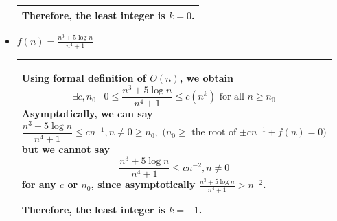 \documentclass[10pt]{article}
\newenvironment{answer}
    {\begin{center}
    \begin{tabular}{|p{1\textwidth}|}
    \hline
    }
    { 
    \\\hline
    \end{tabular} 
    \end{center}
    }
\begin{document}
\begin{itemize}
\begin{answer}
    Therefore, the least integer is $k = 0$.
  \end{answer} 

\item $f(n) = \frac{n^3 + 5 \log n}{n^4 + 1}$
  \begin{answer}
    Using formal definition of $O(n)$, we obtain
    \[\exists c,n_0 \mid 0 \le \frac{n^3 + 5 \log n}{n^4 + 1} \le c(n^k) \textrm{ for all $n \ge n_0$}\]
    Asymptotically, we can say
    \[ \frac{n^3 + 5 \log n}{n^4 + 1} \le cn^{-1}, n \neq 0 \ge n_0, \textrm{ ($n_0 \ge $ the root of $\pm cn^{-1} \mp f(n) = 0$)}\]
    but we cannot say 
    \[ \frac{n^3 + 5 \log n}{n^4 + 1} \le cn^{-2} , n \neq 0\]
    for any $c$ or $n_0$, since asymptotically $\frac{n^3 + 5 \log n}{n^4 + 1} > n^{-2}$.

    Therefore, the least integer is $k = -1$.
  \end{answer} 

\end{itemize}

\newpage
\end{document}
